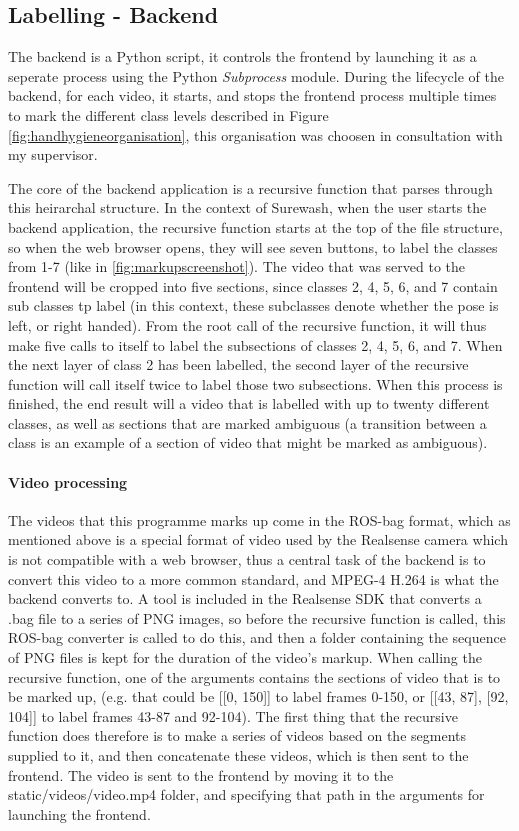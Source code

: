     \subsection{Labelling - Backend}
    The backend is a Python script, it controls the frontend by launching it as a seperate process using the Python {\slshape Subprocess} module. During the lifecycle of the backend, for each video, it starts, and stops the frontend process multiple times to mark the different class levels described in Figure \ref{fig:handhygieneorganisation}, this organisation was choosen in consultation with my supervisor.


    The core of the backend application is a recursive function that parses through this heirarchal structure. In the context of Surewash, when the user starts the backend application, the recursive function starts at the top of the file structure, so when the web browser opens, they will see seven buttons, to label the classes from 1-7 (like in \ref{fig:markupscreenshot}). The video that was served to the frontend will be cropped into five sections, since classes 2, 4, 5, 6, and 7 contain sub classes tp label (in this context, these subclasses denote whether the pose is left, or right handed). From the root call of the recursive function, it will thus make five calls to itself to label the subsections of classes 2, 4, 5, 6, and 7. When the next layer of class 2 has been labelled, the second layer of the recursive function will call itself twice to label those two subsections. When this process is finished, the end result will a video that is labelled with up to twenty different classes, as well as sections that are marked ambiguous (a transition between a class is an example of a section of video that might be marked as ambiguous).

    \paragraph{Video processing}
    The videos that this programme marks up come in the ROS-bag format, which as mentioned above is a special format of video used by the Realsense camera which is not compatible with a web browser, thus a central task of the backend is to convert this video to a more common standard, and MPEG-4 H.264 is what the backend converts to. A tool is included in the Realsense SDK that converts a .bag file to a series of PNG images, so before the recursive function is called, this ROS-bag converter is called to do this, and then a folder containing the sequence of PNG files is kept for the duration of the video's markup. When calling the recursive function, one of the arguments contains the sections of video that is to be marked up, (e.g. that could be [[0, 150]] to label frames 0-150, or [[43, 87], [92, 104]] to label frames 43-87 and 92-104). The first thing that the recursive function does therefore is to make a series of videos based on the segments supplied to it, and then concatenate these videos, which is then sent to the frontend. The video is sent to the frontend by moving it to the static/videos/video.mp4 folder, and specifying that path in the arguments for launching the frontend.

